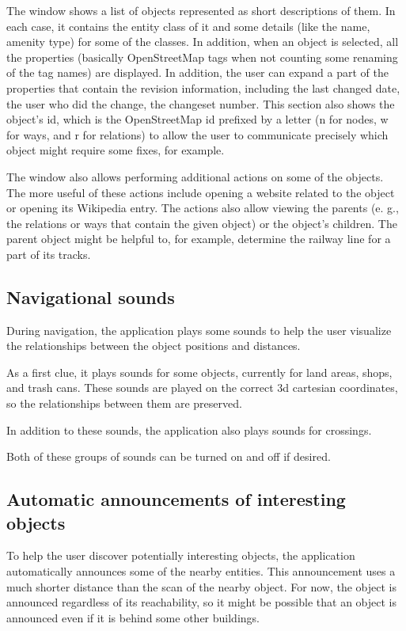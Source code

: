\documentclass[nolof,digital]{fithesis3}
\begin{document}
The window shows a list of objects represented as short descriptions of them. In each case, it contains the entity class of it and some details (like the name, amenity type) for some of the classes. In addition, when an object is selected, all the properties (basically OpenStreetMap tags when not counting some renaming of the tag names) are displayed. In addition, the user can expand a part of the properties that contain the revision information, including the last changed date, the user who did the change, the changeset number. This section also shows the object's id, which is the OpenStreetMap id prefixed by a letter (n for nodes, w for ways, and r for relations) to allow the user to communicate precisely which object might require some fixes, for example.

The window also allows performing additional actions on some of the objects. The more useful of these actions include opening a website related to the object or opening its Wikipedia entry. The actions also allow viewing the parents (e. g., the relations or ways that contain the given object) or the object's children. The parent object might be helpful to, for example, determine the railway line for a part of its tracks.
\subsection{Navigational sounds}
During navigation, the application plays some sounds to help the user visualize the relationships between the object positions and distances.

As a first clue, it plays sounds for some objects, currently for land areas, shops, and trash cans. These sounds are played on the correct 3d cartesian coordinates, so the relationships between them are preserved.

In addition to these sounds, the application also plays sounds for crossings.

Both of these groups of sounds can be turned on and off if desired.
\subsection{Automatic announcements of interesting objects}
To help the user discover potentially interesting objects, the application automatically announces some of the nearby entities. This announcement uses a much shorter distance than the scan of the nearby object. For now, the object is announced regardless of its reachability, so it might be possible that an object is announced even if it is behind some other buildings.
\end{document}
